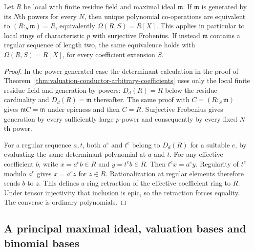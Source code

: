 \begin{proposition}\label{prop:power-generated-and-regular-sequence-bases}
Let $R$ be local with finite residue field and maximal ideal
$\mathfrak m$.
If $\mathfrak m$ is generated by its $N$th powers for every $N$,
then unique polynomial co-operations are equivalent to
$(R:_S\mathfrak m)=R$, equivalently $\Omega(R,S)=R[X]$.
This applies in particular to local rings of characteristic $p$
with surjective Frobenius. If instead $\mathfrak m$ contains a
regular sequence of length two, the same equivalence holds with
$\Omega(R,S)=R[X]$, for every coefficient extension $S$.
\end{proposition}
\begin{proof}
In the power-generated case the determinant calculation in the
proof of Theorem~\ref{thm:valuation-conductor-arbitrary-coefficients}
uses only the local finite residue field and generation by powers:
$D_d(R)=R$ below the residue cardinality and $D_d(R)=\mathfrak m$
thereafter. The same proof with $C=(R:_S\mathfrak m)$ gives
$\mathfrak mC=\mathfrak m$ under epicness and then $C=R$.
Surjective Frobenius gives generation by every sufficiently large
$p$-power and consequently by every fixed $N$th power.

For a regular sequence $a,t$, both $a^e$ and $t^e$ belong to
$D_d(R)$ for a suitable $e$, by evaluating the same determinant
polynomial at $a$ and $t$. For any effective coefficient $b$,
write $x=a^eb\in R$ and $y=t^eb\in R$. Then $t^ex=a^ey$.
Regularity of $t^e$ modulo $a^e$ gives $x=a^ez$ for $z\in R$.
Rationalization at regular elements therefore sends $b$ to $z$.
This defines a ring retraction of the effective coefficient ring
to $R$. Under tensor injectivity that inclusion is epic, so the
retraction forces equality. The converse is ordinary polynomials.
\end{proof}

\subsection{A principal maximal ideal, valuation bases and binomial bases}

